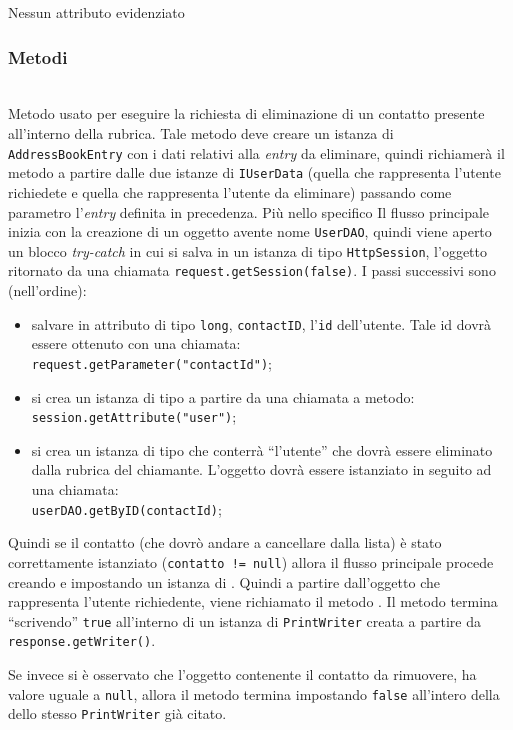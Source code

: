Nessun attributo evidenziato

\subsubsection*{Metodi}
\begin{description}
	\item{}\\	
	Metodo usato per eseguire la richiesta di eliminazione di un contatto presente all'interno della rubrica. Tale metodo deve creare un istanza di \texttt{AddressBookEntry} con i dati relativi alla \textit{entry} da eliminare, quindi richiamerà il metodo  a partire dalle due istanze di \texttt{IUserData} (quella che rappresenta l'utente richiedete e quella che rappresenta l'utente da eliminare) passando come parametro l'\textit{entry} definita in precedenza. Più nello specifico Il flusso principale inizia  con la creazione di un oggetto  avente nome \texttt{UserDAO}, quindi viene aperto un blocco \textit{try-catch} in cui si salva in un istanza di tipo \texttt{HttpSession}, l'oggetto ritornato da una chiamata \verb|request.getSession(false)|. I passi successivi sono (nell'ordine):
	\begin{itemize}
		\item salvare in attributo di tipo \texttt{long}, \texttt{contactID}, l'\texttt{id} dell'utente. Tale id dovrà essere ottenuto con una chiamata:\\
		\verb|request.getParameter("contactId")|;\\
		
		\item si crea un istanza di tipo  a partire da una chiamata a metodo:\\
		\verb|session.getAttribute("user")|;
		
		\item si crea un istanza di tipo  che conterrà ``l'utente'' che dovrà essere eliminato dalla rubrica del chiamante. L'oggetto dovrà essere istanziato in seguito ad una chiamata:\\
		\verb|userDAO.getByID(contactId)|;
	\end{itemize}
	Quindi se il contatto (che dovrò andare a cancellare dalla lista) è stato correttamente istanziato (\texttt{contatto != null}) allora il flusso principale procede creando e impostando un istanza di . Quindi a partire dall'oggetto che rappresenta l'utente richiedente, viene richiamato il metodo . Il metodo termina ``scrivendo'' \texttt{true} all'interno di un istanza di \texttt{PrintWriter} creata a partire da \texttt{response.getWriter()}.
	
	Se invece si è osservato che l'oggetto contenente il contatto da rimuovere, ha valore uguale a \texttt{null}, allora il metodo termina impostando \texttt{false} all'intero della dello stesso \texttt{PrintWriter} già citato.
\end{description}

